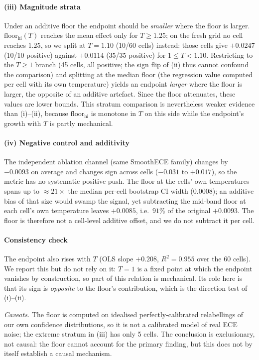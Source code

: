 \documentclass[review,12pt,nonatbib]{elsarticle}
\begin{document}
\paragraph{(iii) Magnitude strata} Under an additive floor the endpoint
should be \emph{smaller} where the floor is larger.
$\text{floor}_{\text{hi}}(T)$ reaches the mean effect only for
$T \geq 1.25$; on the fresh grid no cell reaches $1.25$, so we split at
$T = 1.10$ (10/60 cells) instead: those cells give $+0.0247$ (10/10
positive) against $+0.0114$ (35/35 positive) for $1 \leq T < 1.10$.
Restricting to the
$T \geq 1$ branch (45 cells, all positive; the sign flip of (ii) thus
cannot confound the comparison) and splitting at the median floor (the
regression value computed per cell with its own temperature) yields an
endpoint \emph{larger} where the floor is larger, the opposite of an
additive artefact. Since the floor attenuates, these values are lower
bounds. This stratum comparison is nevertheless weaker evidence than
(i)--(ii), because $\text{floor}_{\text{hi}}$ is monotone in $T$ on this
side while the endpoint's growth with $T$ is partly mechanical.

\paragraph{(iv) Negative control and additivity} The independent
ablation channel (same SmoothECE family) changes by $-0.0093$ on average
and changes sign across cells ($-0.031$ to $+0.017$), so the metric has
no systematic positive push. The floor at the cells' own temperatures
spans up to $\approx 21\times$ the median per-cell
bootstrap CI width ($0.0008$); an additive bias of that size would swamp
the signal, yet subtracting the mid-band floor at each cell's own
temperature leaves $+0.0085$, i.e.\ $91\%$ of the original $+0.0093$. The
floor is therefore not a cell-level additive offset, and we do not
subtract it per cell.

\paragraph{Consistency check} The endpoint also rises with $T$ (OLS
slope $+0.208$, $R^2 = 0.955$ over the 60 cells). We report this but do
not rely on it: $T = 1$ is a fixed point at which the endpoint vanishes
by construction, so part of this relation is mechanical. Its role here
is that its sign is \emph{opposite} to the floor's contribution, which is
the direction test of (i)--(ii).

\emph{Caveats.} The floor is computed on idealised perfectly-calibrated
relabellings of our own confidence distributions, so it is not a
calibrated model of real ECE noise; the extreme stratum in (iii) has only
5 cells. The conclusion is exclusionary, not causal: the floor cannot
account for the primary finding, but this does not by itself establish a
causal mechanism.
\end{document}
